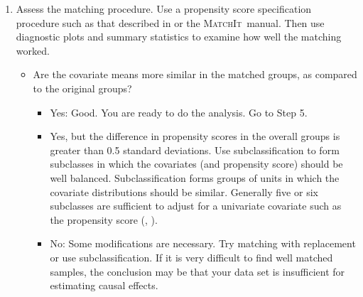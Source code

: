 \documentclass[11pt,titlepage]{article}
\newcommand{\MatchIt}{\textsc{MatchIt}}
\begin{document}
\begin{enumerate}
\begin{itemize}
        	\item Are there some units (either treated or control) that are outside the range of the propensity score values for the other group, i.e., are there some units
	in one group that don't look like any units in the other group?  This can be seen in diagnostic plots such as those output by \MatchIt.
        \begin{itemize} \item Yes: Consider discarding units outside the range of common support.
                        \item No: Good!  That is a good situation for matching, and no explicit discarding needs to be done beyond the general matching process.
	\end{itemize}
\end{itemize}

\item Assess the matching procedure.  Use a propensity score specification procedure
such as that described in \cite{DehWah02} or the \MatchIt\ manual.  Then use diagnostic plots and
summary statistics to examine how well the matching worked.  
\begin{itemize} \item Are the covariate means more similar in the matched groups, as compared to the original groups?
        \begin{itemize} \item Yes:  Good.  You are ready to do the analysis.  Go to Step 5.
                        \item Yes, but the difference in propensity scores in the overall groups is greater than 0.5 standard deviations.  Use 
		subclassification to form subclasses in which the covariates (and propensity score) should be well balanced.  Subclassification forms groups of units
		in which the covariate distributions should be similar.  Generally five or six subclasses are sufficient to adjust for a univariate covariate
		such as the propensity score (\cite{Cochran68}, \cite{RosRub84}).                                              	
			\item No:  Some modifications are necessary.  Try matching with replacement or use subclassification.  If it is very difficult to 
		find well matched samples, the conclusion may be that your data set is insufficient for estimating causal effects.
        \end{itemize}
\end{itemize}
                                                                                                                                                     

\end{enumerate}
\end{document}
